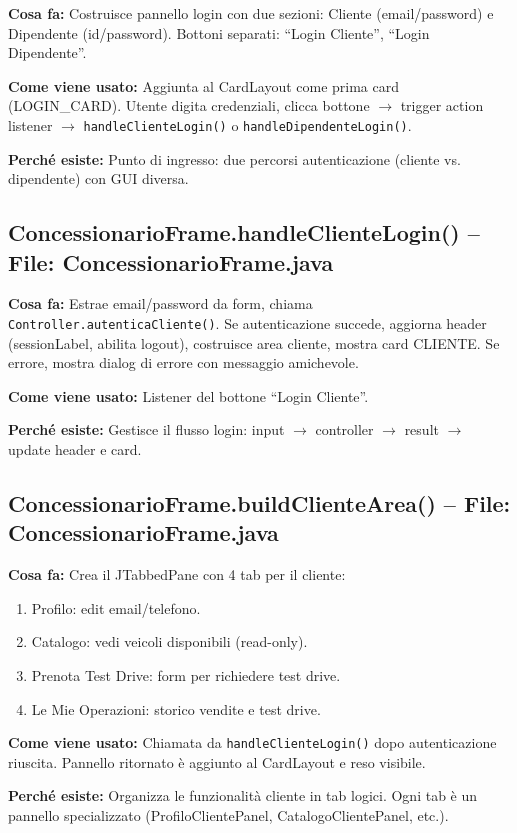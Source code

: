 \documentclass[12pt,a4paper]{article}
\begin{document}
\textbf{Cosa fa:}
Costruisce pannello login con due sezioni: Cliente (email/password) e Dipendente (id/password).
Bottoni separati: ``Login Cliente'', ``Login Dipendente''.

\textbf{Come viene usato:}
Aggiunta al CardLayout come prima card (LOGIN\_CARD).
Utente digita credenziali, clicca bottone $\to$ trigger action listener $\to$ \texttt{handleClienteLogin()} o \texttt{handleDipendenteLogin()}.

\textbf{Perché esiste:}
Punto di ingresso: due percorsi autenticazione (cliente vs. dipendente) con GUI diversa.

\subsection{ConcessionarioFrame.handleClienteLogin() -- File: ConcessionarioFrame.java}

\textbf{Cosa fa:}
Estrae email/password da form, chiama \texttt{Controller.autenticaCliente()}.
Se autenticazione succede, aggiorna header (sessionLabel, abilita logout), costruisce area cliente, mostra card CLIENTE.
Se errore, mostra dialog di errore con messaggio amichevole.

\textbf{Come viene usato:}
Listener del bottone ``Login Cliente''.

\textbf{Perché esiste:}
Gestisce il flusso login: input $\to$ controller $\to$ result $\to$ update header e card.

\subsection{ConcessionarioFrame.buildClienteArea() -- File: ConcessionarioFrame.java}

\textbf{Cosa fa:}
Crea il JTabbedPane con 4 tab per il cliente:
\begin{enumerate}
  \item Profilo: edit email/telefono.
  \item Catalogo: vedi veicoli disponibili (read-only).
  \item Prenota Test Drive: form per richiedere test drive.
  \item Le Mie Operazioni: storico vendite e test drive.
\end{enumerate}

\textbf{Come viene usato:}
Chiamata da \texttt{handleClienteLogin()} dopo autenticazione riuscita.
Pannello ritornato è aggiunto al CardLayout e reso visibile.

\textbf{Perché esiste:}
Organizza le funzionalità cliente in tab logici. Ogni tab è un pannello specializzato (ProfiloClientePanel, CatalogoClientePanel, etc.).
\end{document}
